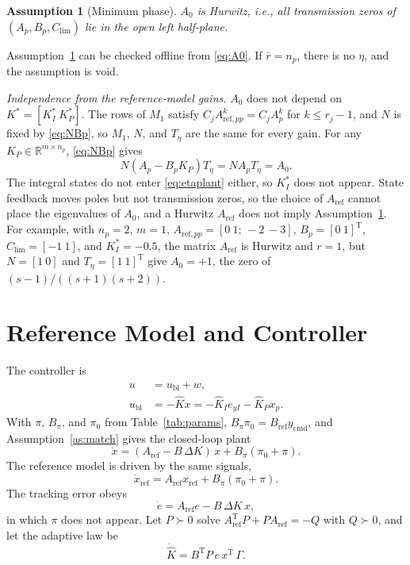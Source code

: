 \documentclass[lettersize,journal]{IEEEtran}
\newtheorem{assumption}{Assumption}
\newcommand{\Kh}{\hat{K}}
\newcommand{\Khd}{\dot{\hat{K}}}
\newcommand{\xr}{x_{\mathrm{ref}}}
\newcommand{\Ar}{A_{\mathrm{ref}}}
\newcommand{\App}{A_{\mathrm{ref},pp}}
\newcommand{\Br}{B_{\mathrm{ref}}}
\newcommand{\ycmd}{y_{\mathrm{cmd}}}
\newcommand{\ub}{u_{\mathrm{bl}}}
\newcommand{\Clim}{C_{\mathrm{lim}}}
\newcommand{\eyI}{e_{yI}}
\newcommand{\T}{\mathrm{T}}
\newcommand{\R}{\mathbb{R}}
\begin{document}
\begin{assumption}[Minimum phase] \label{as:minphase}
$A_0$ is Hurwitz, i.e., all transmission zeros of $(A_p,B_p,\Clim)$ lie in the open left half-plane.
\end{assumption}

Assumption~\ref{as:minphase} can be checked offline from \eqref{eq:A0}. If $\bar r=n_p$, there is no $\eta$, and the assumption is void.

\emph{Independence from the reference-model gains.} $A_0$ does not depend on $K^*=[K_I^*\ K_P^*]$. The rows of $M_1$ satisfy $C_j\App^k=C_jA_p^k$ for $k\le r_j-1$, and $N$ is fixed by \eqref{eq:NBp}, so $M_1$, $N$, and $T_\eta$ are the same for every gain. For any $K_P\in\R^{m\times n_p}$, \eqref{eq:NBp} gives
\[
N(A_p-B_pK_P)T_\eta=NA_pT_\eta=A_0.
\]
The integral states do not enter \eqref{eq:etaplant} either, so $K_I^*$ does not appear. State feedback moves poles but not transmission zeros, so the choice of $\Ar$ cannot place the eigenvalues of $A_0$, and a Hurwitz $\Ar$ does not imply Assumption~\ref{as:minphase}. For example, with $n_p=2$, $m=1$, $\App=[0\ 1;\,-2\ -3]$, $B_p=[0\ 1]^\T$, $\Clim=[-1\ 1]$, and $K_I^*=-0.5$, the matrix $\Ar$ is Hurwitz and $r=1$, but $N=[1\ 0]$ and $T_\eta=[1\ 1]^\T$ give $A_0=+1$, the zero of $(s-1)/((s+1)(s+2))$.

\section{Reference Model and Controller} \label{sec:ctrl}

The controller is
\begin{align}
u &= \ub + w, \label{eq:u}\\
\ub &= -\Kh x = -\Kh_I\eyI - \Kh_P x_p. \label{eq:ubl}
\end{align}
With $\pi$, $B_\pi$, and $\pi_0$ from Table~\ref{tab:params}, $B_\pi\pi_0=\Br\ycmd$, and Assumption~\ref{as:match} gives the closed-loop plant
\begin{equation}
\dot x = (\Ar - B\,\Delta K)\,x + B_\pi(\pi_0+\pi). \label{eq:cl}
\end{equation}
The reference model is driven by the same signals,
\begin{equation}
\dot x_{\mathrm{ref}} = \Ar\xr + B_\pi(\pi_0+\pi). \label{eq:ref}
\end{equation}
The tracking error obeys
\begin{equation}
\dot e = \Ar e - B\,\Delta K\,x, \label{eq:err}
\end{equation}
in which $\pi$ does not appear. Let $P\succ0$ solve $\Ar^\T P + P\Ar = -Q$ with $Q\succ0$, and let the adaptive law be \cite{lavretsky2024}
\begin{equation}
\Khd = B^\T P\,e\,x^\T\,\Gamma. \label{eq:adapt}
\end{equation}
\end{document}
